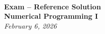 \documentclass[12pt,addpoints]{exam}
\begin{document}
{\noindent\Huge\bf  \\[0.5\baselineskip] {\selectfont  Exam -- Reference Solution}}\\[2\baselineskip]
{ {\bf {}\selectfont Numerical Programming I}\\
{\textit{\selectfont     February 6, 2026}}}
\\[1.4\baselineskip] 


\vspace{2cm}

\begin{center}
\gradetable[h][questions]
\end{center}

\pagebreak

\end{document}
